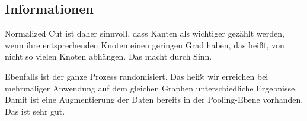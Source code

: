 \subsection{Informationen}

Normalized Cut ist daher sinnvoll, dass Kanten als wichtiger gezählt werden, wenn ihre entsprechenden Knoten einen geringen Grad haben, das heißt, von nicht so vielen Knoten abhängen.
Das macht durch Sinn.

Ebenfalls ist der ganze Prozess randomisiert.
Das heißt wir erreichen bei mehrmaliger Anwendung auf dem gleichen Graphen unterschiedliche Ergebnisse.
Damit ist eine Augmentierung der Daten bereits in der Pooling-Ebene vorhanden.
Das ist sehr gut.

\newpage
